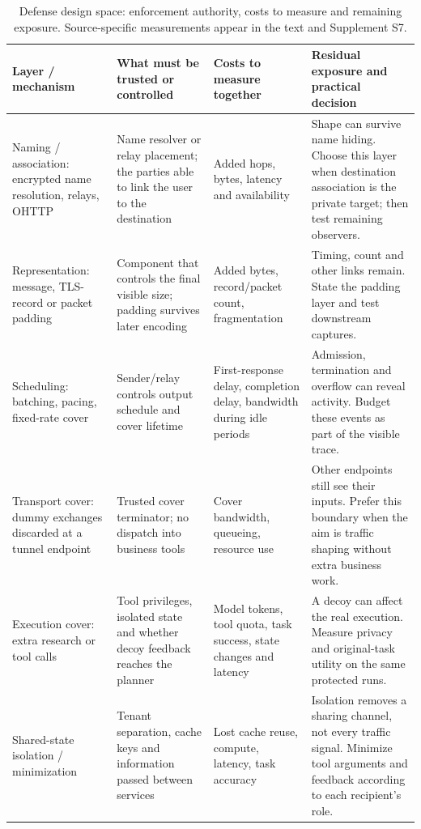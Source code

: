 \begin{table}[t]\centering\small
\caption{Defense design space: enforcement authority, costs to measure and remaining exposure. Source-specific measurements appear in the text and Supplement S7.}
\label{tab:defense-space}
\setlength{\tabcolsep}{4pt}
\begin{tabularx}{\textwidth}{@{}P{.17\textwidth}P{.25\textwidth}P{.23\textwidth}Y@{}}\toprule
Layer / mechanism & What must be trusted or controlled & Costs to measure together & Residual exposure and practical decision \\\midrule
Naming / association: encrypted name resolution, relays, OHTTP & Name resolver or relay placement; the parties able to link the user to the destination & Added hops, bytes, latency and availability & Shape can survive name hiding. Choose this layer when destination association is the private target; then test remaining observers. \\\addlinespace[3pt]
Representation: message, TLS-record or packet padding & Component that controls the final visible size; padding survives later encoding & Added bytes, record/packet count, fragmentation & Timing, count and other links remain. State the padding layer and test downstream captures. \\\addlinespace[3pt]
Scheduling: batching, pacing, fixed-rate cover & Sender/relay controls output schedule and cover lifetime & First-response delay, completion delay, bandwidth during idle periods & Admission, termination and overflow can reveal activity. Budget these events as part of the visible trace. \\\addlinespace[3pt]
Transport cover: dummy exchanges discarded at a tunnel endpoint & Trusted cover terminator; no dispatch into business tools & Cover bandwidth, queueing, resource use & Other endpoints still see their inputs. Prefer this boundary when the aim is traffic shaping without extra business work. \\\addlinespace[3pt]
Execution cover: extra research or tool calls & Tool privileges, isolated state and whether decoy feedback reaches the planner & Model tokens, tool quota, task success, state changes and latency & A decoy can affect the real execution. Measure privacy and original-task utility on the same protected runs. \\\addlinespace[3pt]
Shared-state isolation / minimization & Tenant separation, cache keys and information passed between services & Lost cache reuse, compute, latency, task accuracy & Isolation removes a sharing channel, not every traffic signal. Minimize tool arguments and feedback according to each recipient's role. \\\bottomrule
\end{tabularx}
\end{table}
